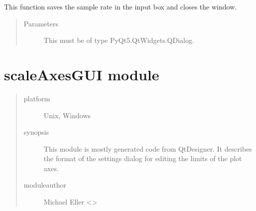 \documentclass[letterpaper,10pt,english]{sphinxmanual}
\begin{document}
\begin{fulllineitems}
\begin{fulllineitems}
\end{fulllineitems}


\begin{fulllineitems}
\label{\detokenize{sampRateGUI:sampRateGUI.Ui_Dialog.save}}
This function saves the sample rate in the input box and closes the window.
\begin{quote}\begin{description}
\item[{Parameters}] \leavevmode
{} \textendash{} This must be of type PyQt5.QtWidgets.QDialog.

\end{description}\end{quote}

\end{fulllineitems}


\end{fulllineitems}



\section{scaleAxesGUI module}
\label{\detokenize{scaleAxesGUI:module-scaleAxesGUI}}\label{\detokenize{scaleAxesGUI:scaleaxesgui-module}}\label{\detokenize{scaleAxesGUI::doc}}\begin{quote}\begin{description}
\item[{platform}] \leavevmode
Unix, Windows

\item[{synopsis}] \leavevmode
This module is mostly generated code from QtDesigner. It describes the format of the settings
dialog for editing the limits of the plot axes.

\item[{moduleauthor}] \leavevmode
Michael Eller \textless{}\textgreater{}

\end{description}\end{quote}
\end{document}
